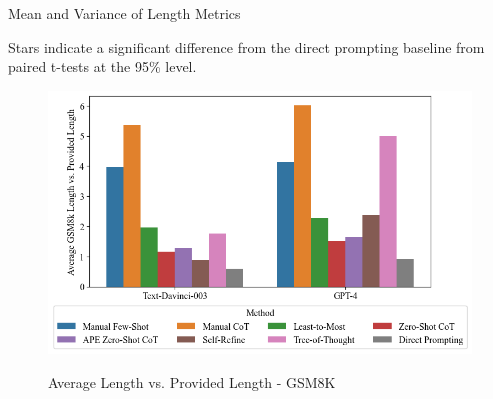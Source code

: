 \documentclass[11pt]{article}
\begin{document}
\onecolumn

\begin{table}
  \caption{Mean and Variance of Length Metrics}
  \centering
  \tiny
    
  \label{tab:avg_length_metrics_pivot}
  \newline \newline \footnotesize Stars indicate a significant difference from the direct prompting baseline from paired t-tests at the 95\% level.
\end{table}

\begin{figure}[h]
  \caption{Average Length vs. Provided Length - GSM8K}
  \centering
  \includegraphics[width=\textwidth]{../Output/gsm8k_length_vs_provided_means.png}
  \label{fig:gsm8k_len_v_prov}
\end{figure}
\end{document}
